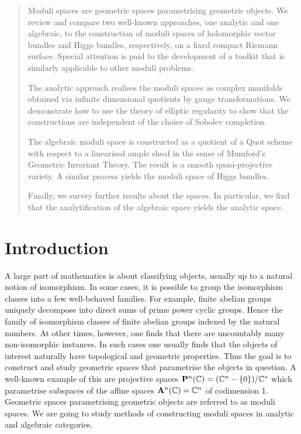 \documentclass[12pt]{ociamthesis}  %
\begin{document}
\begin{abstract}
  Moduli spaces are geometric spaces parametrising geometric objects.  We review
  and compare two well-known approaches, one analytic and one algebraic, to the
  construction of moduli spaces of holomorphic vector bundles and Higgs bundles,
  respectively, on a fixed compact Riemann surface. Special attention
  is paid to the development of a toolkit that is similarly applicable to
  other moduli problems.

  The analytic approach realises the moduli spaces as complex
  manifolds obtained via infinite dimensional quotients by gauge
  transformations. We demonstrate how to use the theory of elliptic
  regularity to show that the constructions are independent
  of the choice of Sobolev completion.

  The algebraic moduli space is constructed as a quotient of a
  Quot scheme with respect to a linearised ample sheaf in the
  sense of Mumford's Geometric Invariant Theory. The result is a smooth
  quasi-projective variety. A similar process yields the moduli
  space of Higgs bundles.

  Finally, we survey further results about the spaces. In particular,
  we find that the analytification of the algebraic space yields the
  analytic space.
\end{abstract}

\begin{romanpages}          %
  \setcounter{tocdepth}{2}
  \tableofcontents            %
\end{romanpages}            %

\chapter{Introduction}

A large part of mathematics is about classifying objects, usually
up to a natural notion of isomorphism. In some cases,
it is possible to group the isomorphism classes into a few well-behaved
families. For example, finite abelian groups uniquely decompose
into direct sums of prime power cyclic groups. Hence the family of
isomorphism classes of finite abelian groups indexed by the natural
numbers.  At other times, however, one finds that there are uncountably
many non-isomorphic instances. In such cases one usually finds that
the objects of interest naturally have topological and geometric
properties. Thus the goal is to construct and study geometric spaces
that parametrise the objects in question. A well-known example
of this are projective spaces
$\mathbf{P}^{n}_{}(\mathbb C) = (\mathbb C^n - \{0\})/\mathbb C^*$
which parametrise subspaces of the affine spaces $\mathbf{A}^{n}_{}(\mathbb C) = \mathbb C^n$
of codimension 1. Geometric
spaces parametrising geometric objects are referred to as moduli spaces.
We are going to study methods of constructing
moduli spaces in analytic and algebraic categories.
\end{document}
